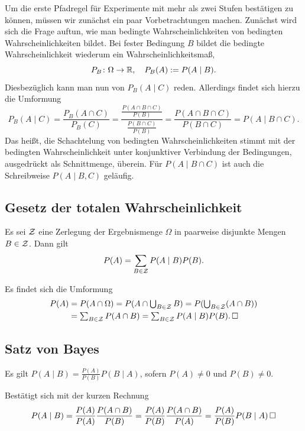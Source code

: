 \noindent
Um die erste Pfadregel für Experimente mit mehr als zwei Stufen bestätigen
zu können, müssen wir zunächst ein paar Vorbetrachtungen machen.
Zunächst wird sich die Frage auftun, wie man bedingte Wahrscheinlichkeiten
von bedingten Wahrscheinlichkeiten bildet. Bei fester Bedingung $B$
bildet die bedingte Wahrscheinlichkeit wiederum ein Wahrscheinlichkeitsmaß,%
\[P_B\colon\Omega\to\mathbb R,\quad P_B(A) := P(A\mid B).\]
Diesbezüglich kann man nun von $P_B(A\mid C)$ reden. Allerdings findet
sich hierzu die Umformung%
\[P_B(A\mid C) = \frac{P_B(A\cap C)}{P_B(C)}
= \frac{\frac{P(A\cap B\cap C)}{P(B)}}{\frac{P(B\cap C)}{P(B)}}
= \frac{P(A\cap B\cap C)}{P(B\cap C)} = P(A\mid B\cap C).\]
Das heißt, die Schachtelung von bedingten Wahrscheinlichkeiten stimmt
mit der bedingten Wahrscheinlichkeit unter konjunktiver Verbindung der
Bedingungen, ausgedrückt als Schnittmenge, überein. Für $P(A\mid B\cap C)$
ist auch die Schreibweise $P(A\mid B,C)$ geläufig.

\subsection{Gesetz der totalen Wahrscheinlichkeit}

\begin{Satz}%
\label{Gesetz-der-totalen-Wkt}\newlinefirst
Es sei $\mathcal{Z}$ eine Zerlegung der Ergebnismenge $\Omega$ in
paarweise disjunkte Mengen $B\in\mathcal{Z}$. Dann gilt
\[P(A) = \sum_{B\in\mathcal{Z}}P(A\mid B)P(B).\]
\end{Satz}
\begin{Beweis}
Es findet sich die Umformung
\begin{align*}
P(A) &= \textstyle P(A\cap\Omega) = P(A\cap\bigcup_{B\in\mathcal{Z}} B)
= P(\bigcup_{B\in\mathcal{Z}} (A\cap B))\\
&=\textstyle\sum_{B\in\mathcal{Z}} P(A\cap B)
= \sum_{B\in\mathcal{Z}} P(A\mid B)P(B).\,\Box
\end{align*}
\end{Beweis}

\newpage
\subsection{Satz von Bayes}

\begin{Satz}\label{Satz-von-Bayes}\newlinefirst
Es gilt $P(A\mid B) = \frac{P(A)}{P(B)}P(B\mid A)$, sofern $P(A)\ne 0$ und $P(B)\ne 0$.
\end{Satz}
\begin{Beweis}
Bestätigt sich mit der kurzen Rechnung
\[P(A\mid B) = \frac{P(A)}{P(A)}\frac{P(A\cap B)}{P(B)}
= \frac{P(A)}{P(B)}\frac{P(A\cap B)}{P(A)}
= \frac{P(A)}{P(B)}P(B\mid A)\,\Box\]
\end{Beweis}

